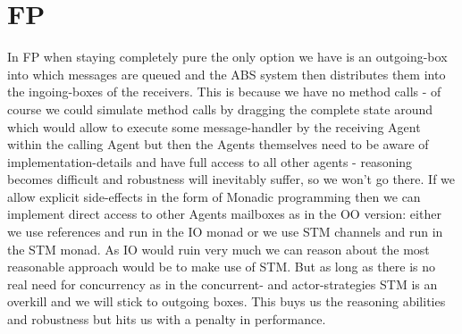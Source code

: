 \section{FP}
In FP when staying completely pure the only option we have is an outgoing-box into which messages are queued and the ABS system then distributes them into the ingoing-boxes of the receivers. This is because we have no method calls - of course we could simulate method calls by dragging the complete state around which would allow to execute some message-handler by the receiving Agent within the calling Agent but then the Agents themselves need to be aware of implementation-details and have full access to all other agents - reasoning becomes difficult and robustness will inevitably suffer, so we won't go there.
If we allow explicit side-effects in the form of Monadic programming then we can implement direct access to other Agents mailboxes as in the OO version: either we use references and run in the IO monad or we use STM channels and run in the STM monad. As IO would ruin very much we can reason about the most reasonable approach would be to make use of STM. But as long as there is no real need for concurrency as in the concurrent- and actor-strategies STM is an overkill and we will stick to outgoing boxes. This buys us the reasoning abilities and robustness but hits us with a penalty in performance.
